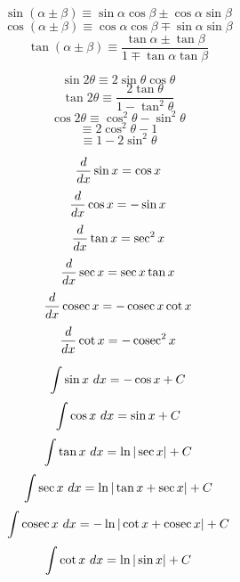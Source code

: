 \documentclass[../main.tex]{subfile}
\begin{document}
\vspace{2.5em}

\begin{figure}[h]
\centering
\large
\begin{minipage}{0.49\linewidth}
	$$\sin(\alpha \pm \beta) \equiv \sin\alpha\cos\beta \pm \cos\alpha\sin\beta$$
	\vspace{0.5em}
	$$\cos(\alpha \pm \beta) \equiv \cos\alpha\cos\beta \mp \sin\alpha\sin\beta$$
	\vspace{0.5em}
	$$\tan(\alpha \pm \beta) \equiv \frac{\tan\alpha \pm \tan\beta}{1 \mp \tan\alpha\tan\beta}$$
\end{minipage}\hfill
\begin{minipage}{0.49\linewidth}
	$$\sin 2\theta \equiv 2\sin\theta\cos\theta$$
	\vspace{0.5em}
	$$\tan 2\theta \equiv \frac{2\tan\theta}{1 - \tan^2\theta}$$
	\vspace{0.5em}
	$$\cos 2\theta \equiv \cos^2\theta - \sin^2\theta$$
	$$\equiv 2\cos^2\theta - 1$$
	$$\equiv 1 - 2\sin^2\theta$$
\end{minipage}
\normalsize
\end{figure}

\newpage


\begin{figure}[h]
\centering
\large
\begin{minipage}{0.49\linewidth}
	$$\frac{d}{d x}\sin x = \cos x$$
	\vspace{0.5em}
	$$\frac{d}{d x}\cos x = -\sin x$$
	\vspace{0.5em}
	$$\frac{d}{d x}\tan x = \sec^2 x$$
	\vspace{0.5em}
	$$\frac{d}{d x}\sec x = \sec x\tan x$$
	\vspace{0.5em}
	$$\frac{d}{d x}\mathop{\rm cosec}\nolimits x = -\mathop{\rm cosec}\nolimits x\cot x$$
	\vspace{0.5em}
	$$\frac{d}{d x}\cot x = -\mathop{\rm cosec}\nolimits^2 x$$
\end{minipage}\hfill
\begin{minipage}{0.49\linewidth}
	$$\int \sin x \ d x = -\cos x + C$$
	\vspace{0.5em}
	$$\int \cos x \ d x = \sin x + C$$
	\vspace{0.5em}
	$$\int \tan x \ d x = \ln|\sec x| + C$$
	\vspace{0.5em}
	$$\int \sec x \ d x = \ln|\tan x + \sec x| + C$$
	\vspace{0.5em}
	$$\int \mathop{\rm cosec}\nolimits x \ d x = -\ln|\cot x + \mathop{\rm cosec}\nolimits x| + C$$
	\vspace{0.5em}
	$$\int \cot x \ d x = \ln|\sin x| + C$$
\end{minipage}
\end{figure}
\end{document}
